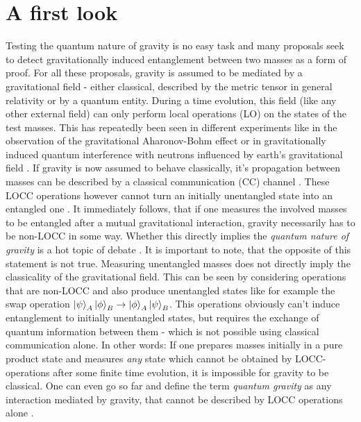 \chapter{A first look}\label{cha:first-look}

Testing the quantum nature of gravity is no easy task and many proposals seek to detect gravitationally induced entanglement between two masses \cite{Marletto_2017,Krisnanda_2020,Chevalier_2020,Pedernales_2019,Bose_2017} as a form of proof. 
For all these proposals, gravity is assumed to be mediated by a gravitational field - either classical, described by the metric tensor in general relativity or by a quantum entity.
During a time evolution, this field (like any other external field) can only perform local operations (LO) on the states of the test masses.
This has repeatedly been seen in different experiments like in the observation of the gravitational Aharonov-Bohm effect \cite{Overstreet_2022} or in gravitationally induced quantum interference with neutrons influenced by earth's gravitational field \cite{Colella_1975}.
If gravity is now assumed to behave classically, it's propagation between masses can be described by a classical communication (CC) channel \cite{Lami_2024}.
These LOCC operations however cannot turn an initially unentangled state into an entangled one \cite{Horodecki_2009, Plenio_2005a}.
It immediately follows, that if one measures the involved masses to be entangled after a mutual gravitational interaction, gravity necessarily has to be non-LOCC in some way.
Whether this directly implies the \textit{quantum nature of gravity} is a hot topic of debate \cite{Hall_2018}.
It is important to note, that the opposite of this statement is not true. Measuring unentangled masses does not directly imply the classicality of the gravitational field.
This can be seen by considering operations that are non-LOCC and also produce unentangled states like for example the swap operation $\ket{\psi}_A\ket{\phi}_B \rightarrow \ket{\phi}_A\ket{\psi}_B$. This operations obviously can't induce entanglement to initially unentangled states, but requires the exchange of quantum information between them - which is not possible using classical communication alone.
In other words: If one prepares masses initially in a pure product state and measures \textit{any} state which cannot be obtained by LOCC-operations after some finite time evolution, it is impossible for gravity to be classical. One can even go so far and define the term \emph{quantum gravity} as any interaction mediated by gravity, that cannot be described by LOCC operations alone \cite{Lami_2024}.

